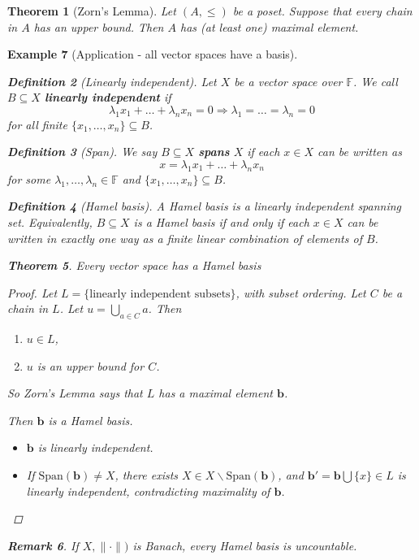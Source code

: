\documentclass[12pt, oneside, a4paper]{article}
\newtheorem{thm}{Theorem}[section]
\theoremstyle{dfn}
\newtheorem{dfn}[thm]{Definition}
\newtheorem{rem}[thm]{Remark}
\newtheorem{ex}[thm]{Example}
\newcommand{\F}{\mathbb{F}}
\begin{document}
\begin{thm}[Zorn's Lemma]
    Let $(A, \leq)$ be a poset.  Suppose that every chain in $A$ has an upper bound.  Then $A$ has (at least one) maximal element.  
\end{thm}

\begin{ex}[Application - all vector spaces have a basis]
    \begin{dfn}[Linearly independent]
        Let $X$ be a vector space over $\F$.  We call $B \subseteq X$ \textbf{linearly independent} if \[
            \lambda_1 x_1 + \dots + \lambda_n x_n = 0 \Rightarrow \lambda_1 = \dots = \lambda_n = 0
        \] for all finite $\{ x_1, \dots, x_n \} \subseteq B$. 
    \end{dfn}
    
    \begin{dfn}[Span]
        We say $B \subseteq X$ \textbf{spans} $X$ if each $x \in X$ can be written as \[
            x = \lambda_1 x_1 + \dots + \lambda_n x_n
        \] for some $\lambda_1, \dots, \lambda_n \in \F$ and $\{ x_1, \dots, x_n \} \subseteq B$. 
    \end{dfn}
    
    \begin{dfn}[Hamel basis]
        A Hamel basis is a linearly independent spanning set. Equivalently, $B \subseteq X$ is a Hamel basis if and only if each $x \in X$ can be written in exactly one way as a finite linear combination of elements of $B$.
    \end{dfn}
    
    \begin{thm}
        Every vector space has a Hamel basis
    \end{thm}
    
    \begin{proof}
        Let $L = \{ \text{linearly independent subsets} \}$, with subset ordering.  Let $C$ be a chain in $L$.  Let $u = \bigcup_{a \in C} a$.  Then 
        \begin{enumerate}[(1)]
            \item $u \in L$,
            \item $u$ is an upper bound for $C$.
        \end{enumerate}  
        So Zorn's Lemma says that $L$ has a maximal element $\mathbf{b}$.  
        
        Then $\mathbf{b}$ is a Hamel basis. 
        \begin{itemize}
            \item $\mathbf{b}$ is linearly independent.  
            \item If $\text{Span}(\mathbf{b}) \neq X$, there exists $X \in X \backslash \text{Span}(\mathbf{b})$, and $\mathbf{b'} = \mathbf{b} \bigcup \{ x \} \in L$ is linearly independent, contradicting maximality of $\mathbf{b}$.
        \end{itemize}  
    \end{proof}
    
    \begin{rem}
        If $ X, \| \cdot \| )$ is Banach, every Hamel basis is uncountable.
    \end{rem}
\end{ex}
\end{document}
